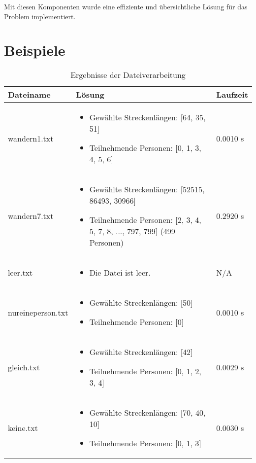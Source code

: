 \documentclass[a4paper,10pt,ngerman]{scrartcl}
\begin{document}
Mit diesen Komponenten wurde eine effiziente und übersichtliche Lösung für das Problem implementiert.





\clearpage
\section{Beispiele}
\begin{table}[htbp]
\centering
\begin{tabular}{|p{2.5cm}|p{9.5cm}|p{2.5cm}|}
\hline
\textbf{Dateiname} & \textbf{Lösung} & \textbf{Laufzeit} \\
\hline
\raggedright wandern1.txt & 
\begin{itemize}
    \item Gewählte Streckenlängen: [64, 35, 51]
    \item Teilnehmende Personen: [0, 1, 3, 4, 5, 6]
\end{itemize} & 0.0010 s \\
\hline
\raggedright wandern7.txt & 
\begin{itemize}
    \item Gewählte Streckenlängen: [52515, 86493, 30966]
    \item Teilnehmende Personen: [2, 3, 4, 5, 7, 8, ..., 797, 799] (499 Personen)
\end{itemize} & 0.2920 s \\
\hline
\raggedright leer.txt & 
\begin{itemize}
    \item Die Datei ist leer.
\end{itemize} & N/A \\
\hline
\raggedright nureineperson.txt & 
\begin{itemize}
    \item Gewählte Streckenlängen: [50]
    \item Teilnehmende Personen: [0]
\end{itemize} & 0.0010 s \\
\hline
\raggedright gleich.txt & 
\begin{itemize}
    \item Gewählte Streckenlängen: [42]
    \item Teilnehmende Personen: [0, 1, 2, 3, 4]
\end{itemize} & 0.0029 s \\
\hline
\raggedright keine.txt & 
\begin{itemize}
    \item Gewählte Streckenlängen: [70, 40, 10]
    \item Teilnehmende Personen: [0, 1, 3]
\end{itemize} & 0.0030 s \\
\hline
\end{tabular}
\caption{Ergebnisse der Dateiverarbeitung}
\label{tab:ergebnisse}
\end{table}
\end{document}

